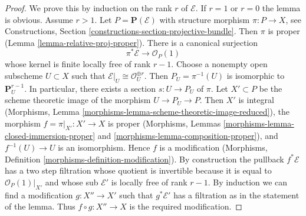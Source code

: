\documentclass[10pt,a4paper]{amsart}
\theoremstyle{plain}
\theoremstyle{definition}
\theoremstyle{remark}
\numberwithin{equation}{subsection}
\begin{document}
\begin{proof}
We prove this by induction on the rank $r$ of $\mathcal{E}$.
If $r = 1$ or $r = 0$ the lemma is obvious. Assume $r > 1$.
Let $P = \mathbf{P}(\mathcal{E})$ with structure morphism $\pi : P \to X$,
see Constructions, Section \ref{constructions-section-projective-bundle}.
Then $\pi$ is proper (Lemma \ref{lemma-relative-proj-proper}).
There is a canonical surjection
$$
\pi^*\mathcal{E} \to \mathcal{O}_P(1)
$$
whose kernel is finite locally free of rank $r - 1$.
Choose a nonempty open subscheme $U \subset X$ such that
$\mathcal{E}|_U \cong \mathcal{O}_U^{\oplus r}$.
Then $P_U = \pi^{-1}(U)$ is isomorphic to $\mathbf{P}^{r - 1}_U$.
In particular, there exists a section $s : U \to P_U$ of $\pi$.
Let $X' \subset P$ be the scheme theoretic image of the
morphism $U \to P_U \to P$. Then $X'$ is integral
(Morphisms, Lemma \ref{morphisms-lemma-scheme-theoretic-image-reduced}),
the morphism $f = \pi|_{X'} : X' \to X$ is proper (Morphisms, Lemmas
\ref{morphisms-lemma-closed-immersion-proper} and
\ref{morphisms-lemma-composition-proper}), and
$f^{-1}(U) \to U$ is an isomorphism. Hence $f$ is a modification
(Morphisms, Definition \ref{morphisms-definition-modification}).
By construction the pullback $f^*\mathcal{E}$ has a two step
filtration whose quotient is invertible because it is equal to
$\mathcal{O}_P(1)|_{X'}$ and whose sub $\mathcal{E}'$ is locally free of rank
$r - 1$. By induction we can find a modification $g : X'' \to X'$
such that $g^*\mathcal{E}'$ has a filtration as in the statement of
the lemma. Thus $f \circ g : X'' \to X$ is the required modification.
\end{proof}
\end{document}
